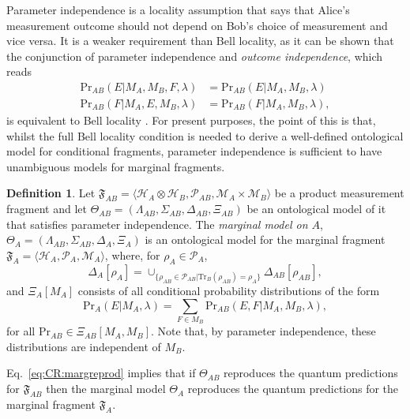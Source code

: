 \documentclass[DIV=calc,fontsize=12pt]{scrartcl} %
\theoremstyle{definition}
\newtheorem{definition}{Definition}[section]
\theoremstyle{plain}
\newcommand{\Hilb}[1][]{\ensuremath{\mathcal{H}_{#1}}}
\newcommand{\Tr}[2][]{\ensuremath{\text{Tr}_{#1} \left ( #2 \right )}}
\begin{document}
Parameter independence is a locality assumption that says that Alice's
measurement outcome should not depend on Bob's choice of measurement
and vice versa.  It is a weaker requirement than Bell locality, as it
can be shown that the conjunction of parameter independence and
\emph{outcome independence}, which reads
\begin{align}
\text{Pr}_{AB}(E|M_A,M_B,F,\lambda) & = \text{Pr}_{AB}(E|M_A,M_B,\lambda) \\
\text{Pr}_{AB}(F|M_A,E,M_B,\lambda) & = \text{Pr}_{AB}(F|M_A,M_B,\lambda),
\end{align}
is equivalent to Bell locality \cite{Jarrett1984, Shimony1993}.  For
present purposes, the point of this is that, whilst the full Bell
locality condition is needed to derive a well-defined ontological
model for conditional fragments, parameter independence is sufficient
to have unambiguous models for marginal fragments.

\begin{definition}
Let $\mathfrak{F}_{AB} = \langle \Hilb[A] \otimes \Hilb[B],
\mathcal{P}_{AB}, \mathcal{M}_A \times \mathcal{M}_B \rangle$ be a
product measurement fragment and let $\Theta_{AB} = ( \Lambda_{AB},
\Sigma_{AB}, \Delta_{AB}, \Xi_{AB} )$ be an ontological model of it
that satisfies parameter independence.  The \emph{marginal model on
$A$}, $\Theta_A = (\Lambda_{AB}, \Sigma_{AB}, \Delta_A, \Xi_A)$ is an
ontological model for the marginal fragment $\mathfrak{F}_A =
\langle \Hilb[A], \mathcal{P}_A, \mathcal{M}_A \rangle$, where, for
$\rho_A \in \mathcal{P}_A$,
\begin{equation}
\Delta_A[\rho_A] =  \cup_{\{\rho_{AB} \in
\mathcal{P}_{AB}|\Tr[B]{\rho_{AB}} = \rho_A\}} \Delta_{AB}[\rho_{AB}],
\end{equation}
and $\Xi_A[M_A]$ consists of all conditional probability
distributions of the form
\begin{equation}
\text{Pr}_A(E|M_A, \lambda) = \sum_{F \in M_B}
\text{Pr}_{AB}(E,F|M_A,M_B, \lambda),
\end{equation}
for all $\text{Pr}_{AB} \in \Xi_{AB}[M_A,M_B]$.  Note that, by
parameter independence, these distributions are independent of
$M_B$.
\end{definition}

Eq.~\eqref{eq:CR:margreprod} implies that if $\Theta_{AB}$ reproduces the
quantum predictions for $\mathfrak{F}_{AB}$ then the marginal model
$\Theta_A$ reproduces the quantum predictions for the marginal fragment
$\mathfrak{F}_A$.
\end{document}
